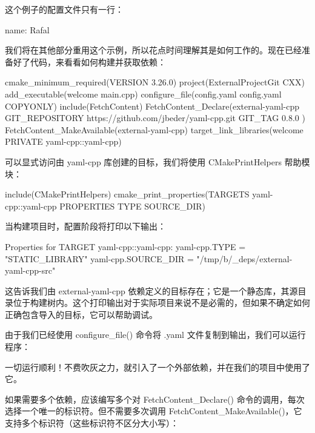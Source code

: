 这个例子的配置文件只有一行：


\begin{shell}
name: Rafal
\end{shell}

我们将在其他部分重用这个示例，所以花点时间理解其是如何工作的。现在已经准备好了代码，来看看如何构建并获取依赖：


\begin{cmake}
cmake_minimum_required(VERSION 3.26.0)
project(ExternalProjectGit CXX)
add_executable(welcome main.cpp)
configure_file(config.yaml config.yaml COPYONLY)
include(FetchContent)
FetchContent_Declare(external-yaml-cpp
    GIT_REPOSITORY https://github.com/jbeder/yaml-cpp.git
    GIT_TAG 0.8.0
)
FetchContent_MakeAvailable(external-yaml-cpp)
target_link_libraries(welcome PRIVATE yaml-cpp::yaml-cpp)
\end{cmake}

可以显式访问由 yaml-cpp 库创建的目标，我们将使用 CMakePrintHelpers 帮助模块：

\begin{cmake}
include(CMakePrintHelpers)
cmake_print_properties(TARGETS yaml-cpp::yaml-cpp
                       PROPERTIES TYPE SOURCE_DIR)
\end{cmake}

当构建项目时，配置阶段将打印以下输出：

\begin{shell}
Properties for TARGET yaml-cpp::yaml-cpp:
    yaml-cpp.TYPE = "STATIC_LIBRARY"
    yaml-cpp.SOURCE_DIR = "/tmp/b/_deps/external-yaml-cpp-src"
\end{shell}

这告诉我们由 external-yaml-cpp 依赖定义的目标存在；它是一个静态库，其源目录位于构建树内。这个打印输出对于实际项目来说不是必需的，但如果不确定如何正确包含导入的目标，它可以帮助调试。

由于我们已经使用 configure\_file() 命令将 .yaml 文件复制到输出，我们可以运行程序：


一切运行顺利！不费吹灰之力，就引入了一个外部依赖，并在我们的项目中使用了它。

如果需要多个依赖，应该编写多个对 FetchContent\_Declare() 命令的调用，每次选择一个唯一的标识符。但不需要多次调用 FetchContent\_MakeAvailable()，它支持多个标识符（这些标识符不区分大小写）：

